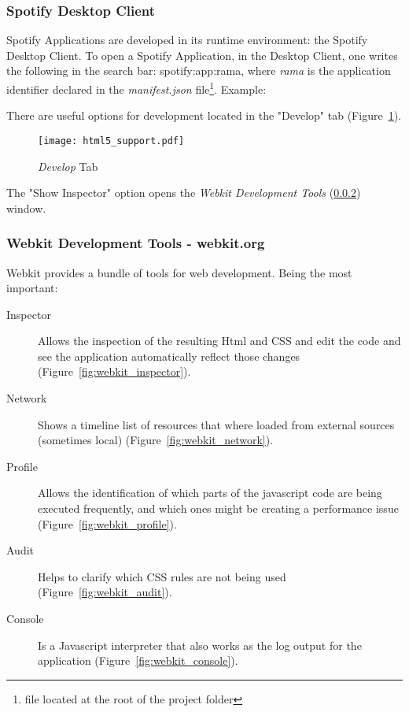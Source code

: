 
    \subsubsection{Spotify Desktop Client} %
    \label{ssub:subsection_name}
      Spotify Applications are developed in its runtime environment: the Spotify Desktop Client.
      To open a Spotify Application, in the Desktop Client, one writes the following in the search bar: spotify:app:rama, where \emph{rama} is the application identifier declared in the \emph{manifest.json} file\footnote{file located at the root of the project folder}.
      Example:

      

      There are useful options for development located in the "Develop" tab (Figure~\ref{fig:html5_support}).

      \begin{figure}[H]
        \begin{center}
          \texttt{[image: html5\_support.pdf]}
        \end{center}
        \caption{\emph{Develop} Tab}
        \label{fig:html5_support}
      \end{figure}

      The "Show Inspector" option opens the \emph{Webkit Development Tools} (\ref{ssub:webkit_tools}) window.

    \subsubsection{Webkit Development Tools - webkit.org} %
    \label{ssub:webkit_tools}

      Webkit provides a bundle of tools for web development.
      Being the most important:

      \begin{description}
        \item[Inspector] Allows the inspection of the resulting Html and CSS and edit the code and see the application automatically reflect those changes (Figure~\ref{fig:webkit_inspector}).
        \item[Network] Shows a timeline list of resources that where loaded from external sources (sometimes local) (Figure~\ref{fig:webkit_network}).
        \item[Profile] Allows the identification of which parts of the javascript code are being executed frequently, and which ones might be creating a performance issue (Figure~\ref{fig:webkit_profile}).
        \item[Audit] Helps to clarify which CSS rules are not being used (Figure~\ref{fig:webkit_audit}).
        \item[Console] Is a Javascript interpreter that also works as the log output for the application (Figure~\ref{fig:webkit_console}).
      \end{description}

